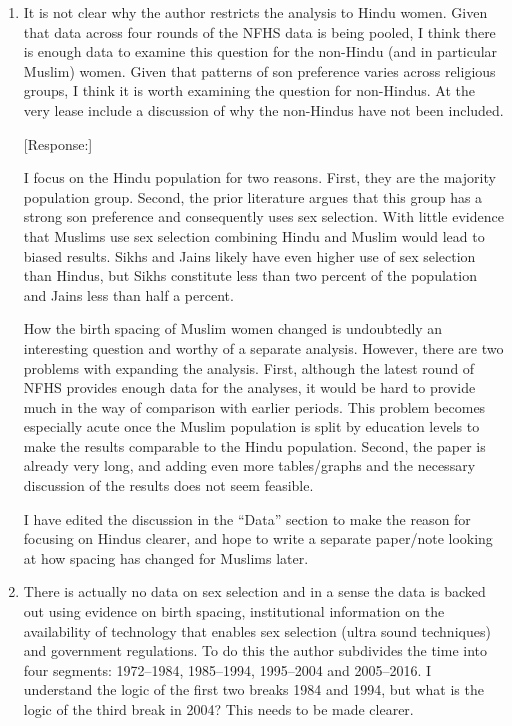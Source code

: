\documentclass[letterpaper,12pt]{article}
\begin{document}
\begin{enumerate}

\item It is not clear why the author restricts the analysis to Hindu
women. Given that data across four rounds of the NFHS data is being
pooled, I think there is enough data to examine this question for the
non-Hindu (and in particular Muslim) women. Given that patterns of son
preference varies across religious groups, I think it is worth examining
the question for non-Hindus. At the very lease include a discussion of
why the non-Hindus have not been included.

[Response:]

I focus on the Hindu population for two reasons. 
First, they are the majority population group. 
Second, the prior literature argues that this group has a strong son preference and 
consequently uses sex selection. 
With little evidence that Muslims use sex selection combining Hindu and Muslim 
would lead to biased results.
Sikhs and Jains likely have even higher use of sex selection than Hindus, but Sikhs 
constitute less than two percent of the population and Jains less than half a percent. 

How the birth spacing of Muslim women changed is undoubtedly an interesting question and 
worthy of a separate analysis. 
However, there are two problems with expanding the analysis. 
First, although the latest round of NFHS provides enough data for the analyses, it would 
be hard to provide much in the way of comparison with earlier periods. 
This problem becomes especially acute once the Muslim population is split by education 
levels to make the results comparable to the Hindu population. 
Second, the paper is already very long, and adding even more tables/graphs and the 
necessary discussion of the results does not seem feasible.

I have edited the discussion in the ``Data'' section to make the reason for focusing
on Hindus clearer, and hope to write a separate paper/note looking at how spacing
has changed for Muslims later.





\item There is actually no data on sex selection and in a sense the data
is backed out using evidence on birth spacing, institutional information
on the availability of technology that enables sex selection (ultra
sound techniques) and government regulations. To do this the author
subdivides the time into four segments: 1972--1984, 1985--1994, 1995--2004
and 2005--2016. I understand the logic of the first two breaks 1984 and
1994, but what is the logic of the third break in 2004? This needs to be
made clearer.


\end{enumerate}
\end{document}
